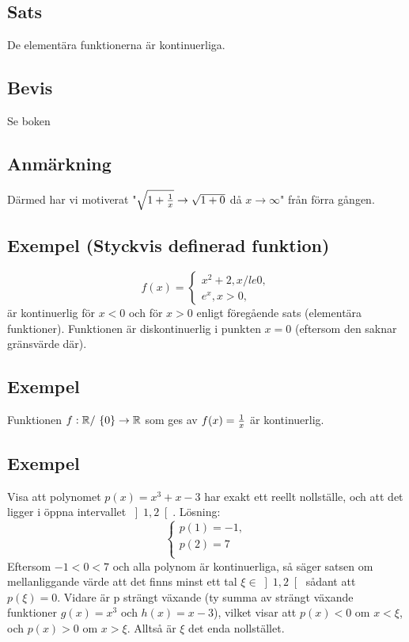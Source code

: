 \documentclass{article}
\begin{document}
\subsection{Sats}
De elementära funktionerna är kontinuerliga.

\subsection{Bevis}
Se boken

\subsection{Anmärkning}
Därmed har vi motiverat "$\sqrt{1+\frac{1}{x}}\to\sqrt{1+0}$ då $x\to\infty$" från förra gången.

\subsection{Exempel (Styckvis definerad funktion)}
$$
f(x)=
\begin{cases}
  x^2+2, x/le 0,\\
  e^x, x>0,
\end{cases}
$$
är kontinuerlig för $x<0$ och för $x>0$ enligt föregående sats (elementära funktioner).
Funktionen är diskontinuerlig i punkten $x=0$ (eftersom den saknar gränsvärde där).

\subsection{Exempel}
Funktionen $f:{\mathbb R}/\ \{0\} \to {\mathbb R}$ som ges av $f(x)=\frac{1}{x}$ är kontinuerlig.

\subsection{Exempel}
Visa att polynomet $p(x) = x^3 + x - 3$ har exakt ett reellt nollställe, och att det ligger i öppna intervallet $\left] 1,2 \right[$.
Lösning:
$$
\begin{cases}
  p(1)=-1, \\
  p(2)=7 \\
\end{cases}
$$
Eftersom $-1<0<7$ och alla polynom är kontinuerliga, så säger satsen om mellanliggande värde att det finns
minst ett tal $\xi\in\left]1,2\right[$ sådant att $p(\xi)=0$.
Vidare är p strängt växande (ty summa av strängt växande funktioner $ g(x) = x^3$ och $h(x) = x-3$),
vilket visar att $p(x)<0$ om $x<\xi$, och $p(x)>0$ om $x>\xi$. Alltså är $\xi$ det enda nollstället.
\end{document}
